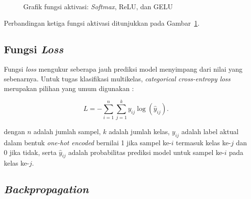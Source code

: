 \begin{figure}[H]
    \centering
    \caption{Grafik fungsi aktivasi: \textit{Softmax}, ReLU, dan GELU}
    \label{fig:activation_functions}
\end{figure}

Perbandingan ketiga fungsi aktivasi ditunjukkan pada
Gambar~\ref{fig:activation_functions}.

\subsection{Fungsi \textit{Loss}}

Fungsi \textit{loss} mengukur seberapa jauh prediksi model menyimpang dari
nilai yang sebenarnya. Untuk tugas klasifikasi multikelas,
\textit{categorical cross-entropy loss} merupakan pilihan yang umum
digunakan \parencite{aggarwal2018neural}:

\begin{equation}
    L = -\sum_{i=1}^{n} \sum_{j=1}^{k} y_{ij} \log(\hat{y}_{ij}).
    \label{eq:categorical_crossentropy}
\end{equation}

\noindent dengan $n$ adalah jumlah sampel, $k$ adalah jumlah kelas, $y_{ij}$
adalah label aktual dalam bentuk \textit{one-hot encoded} bernilai 1
jika sampel ke-$i$ termasuk kelas ke-$j$ dan 0 jika tidak, serta
$\hat{y}_{ij}$ adalah probabilitas prediksi model untuk sampel ke-$i$
pada kelas ke-$j$.

\subsection{\textit{Backpropagation}}


